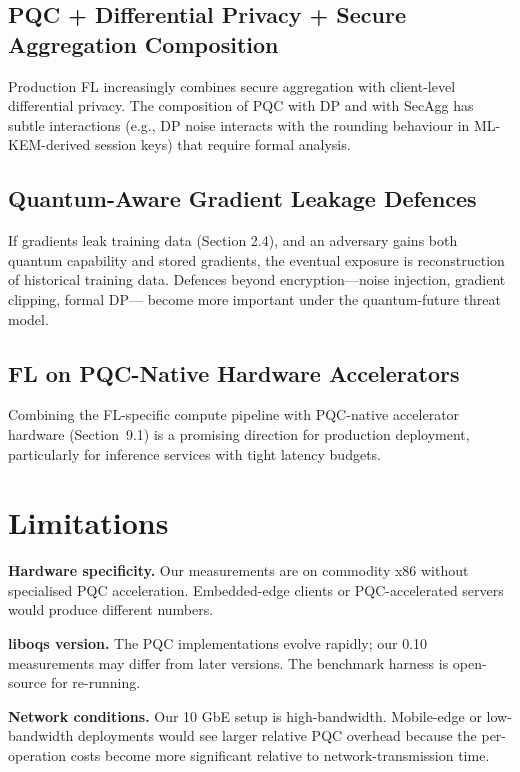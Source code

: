 \documentclass[sigconf,nonacm]{acmart}
\begin{document}
\subsection{PQC + Differential Privacy + Secure Aggregation
Composition}

Production FL increasingly combines secure aggregation with
client-level differential privacy. The composition of PQC with DP
and with SecAgg has subtle interactions (e.g., DP noise interacts
with the rounding behaviour in ML-KEM-derived session keys) that
require formal analysis.

\subsection{Quantum-Aware Gradient Leakage Defences}

If gradients leak training data (Section 2.4), and an adversary
gains both quantum capability and stored gradients, the eventual
exposure is reconstruction of historical training data. Defences
beyond encryption---noise injection, gradient clipping, formal DP---
become more important under the quantum-future threat model.

\subsection{FL on PQC-Native Hardware Accelerators}

Combining the FL-specific compute pipeline with PQC-native
accelerator hardware (Section~9.1) is a promising direction for
production deployment, particularly for inference services with
tight latency budgets.

\section{Limitations}

\textbf{Hardware specificity.} Our measurements are on commodity
x86 without specialised PQC acceleration. Embedded-edge clients or
PQC-accelerated servers would produce different numbers.

\textbf{liboqs version.} The PQC implementations evolve rapidly;
our 0.10 measurements may differ from later versions. The benchmark
harness is open-source for re-running.

\textbf{Network conditions.} Our 10 GbE setup is high-bandwidth.
Mobile-edge or low-bandwidth deployments would see larger relative
PQC overhead because the per-operation costs become more
significant relative to network-transmission time.
\end{document}

